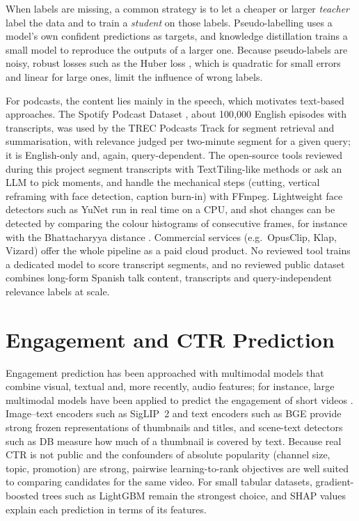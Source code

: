When labels are missing, a common strategy is to let a cheaper or larger \textit{teacher} label the data and to train a \textit{student} on those labels. Pseudo-labelling \cite{lee2013pseudolabel} uses a model's own confident predictions as targets, and knowledge distillation \cite{hinton2015distilling} trains a small model to reproduce the outputs of a larger one. Because pseudo-labels are noisy, robust losses such as the Huber loss \cite{huber1964robust}, which is quadratic for small errors and linear for large ones, limit the influence of wrong labels.

For podcasts, the content lies mainly in the speech, which motivates text-based approaches. The Spotify Podcast Dataset \cite{clifton2020spotify}, about 100{,}000 English episodes with transcripts, was used by the TREC Podcasts Track for segment retrieval and summarisation, with relevance judged per two-minute segment for a given query; it is English-only and, again, query-dependent. The open-source tools reviewed during this project segment transcripts with TextTiling-like methods or ask an LLM to pick moments, and handle the mechanical steps (cutting, vertical reframing with face detection, caption burn-in) with FFmpeg. Lightweight face detectors such as YuNet \cite{wu2023yunet} run in real time on a CPU, and shot changes can be detected by comparing the colour histograms of consecutive frames, for instance with the Bhattacharyya distance \cite{bhattacharyya1943}. Commercial services (e.g.\ OpusClip, Klap, Vizard) offer the whole pipeline as a paid cloud product. No reviewed tool trains a dedicated model to score transcript segments, and no reviewed public dataset combines long-form Spanish talk content, transcripts and query-independent relevance labels at scale.

\section{Engagement and CTR Prediction}

Engagement prediction has been approached with multimodal models that combine visual, textual and, more recently, audio features; for instance, large multimodal models have been applied to predict the engagement of short videos \cite{sun2025engagement}. Image--text encoders such as SigLIP~2 \cite{tschannen2025siglip2} and text encoders such as BGE \cite{xiao2023bge} provide strong frozen representations of thumbnails and titles, and scene-text detectors such as DB \cite{liao2020db} measure how much of a thumbnail is covered by text. Because real CTR is not public and the confounders of absolute popularity (channel size, topic, promotion) are strong, pairwise learning-to-rank objectives \cite{burges2005ranknet} are well suited to comparing candidates for the same video. For small tabular datasets, gradient-boosted trees such as LightGBM \cite{ke2017lightgbm} remain the strongest choice, and SHAP values \cite{lundberg2017shap} explain each prediction in terms of its features.

